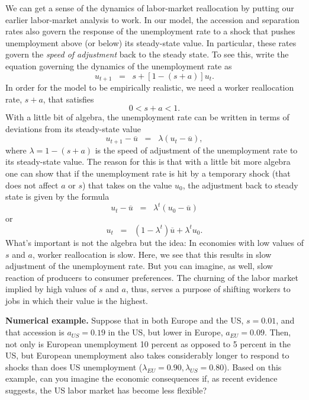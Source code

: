 We can get a sense of the dynamics of labor-market reallocation
 by putting our earlier labor-market analysis to work.
In our model, the accession and separation rates also govern the response of the unemployment rate to a shock that pushes unemployment above (or below) its steady-state value. In particular, these rates govern the {\it speed of adjustment} back to the steady state. To see this, write the equation governing the dynamics of the unemployment rate as
\[
    u_{t+1} \;\;=\;\; s+ [1-(s+a)] u_{t} .
\]
In order for the model to be empirically realistic, we need a worker reallocation rate, $s+a$, that satisfies
\[0<s+a<1.\]
With a little bit of algebra, the unemployment rate can be written in terms of deviations from its steady-state value
\[
    u_{t+1}-\overline{u} \;\;=\;\; \lambda (u_t-\overline{u}) ,
\]
where $\lambda=1-(s+a)$ is the speed of adjustment of the unemployment rate to its steady-state value. The reason for this is that with a little bit more algebra one can show that if the unemployment rate is hit by a temporary shock (that does not affect $a$ or $s$) that takes on the value $u_0$, the adjustment back to steady state is given by the formula
\[
    u_t-\overline{u} \;\;=\;\; \lambda^{t}(u_0-\overline{u})
\]
or
\[
    u_t \;\;=\;\; (1-\lambda^{t})\overline{u}+\lambda^{t}u_0 .
\]
What's important is not the algebra but the idea:
In economies with low values of $s$ and $a$,
worker reallocation is slow.
Here, we see that this results in slow adjustment of the unemployment rate.
But you can imagine, as well, slow reaction of producers to consumer
preferences.
The churning of the labor market implied by high values of $s$ and $a$,
thus, serves a purpose of shifting workers to jobs in which their value is the highest.



\begin{comment}
Notice that a high separation rate $s$ has two important effects on the economy: it (i)~raises the steady state unemployment rate, but (ii) helps the economy respond quickly to temporary shocks to unemployment. On the other hand, a high accession rate $a$ has two unambiguously good effects: it (i) reduces the steady state unemployment rate, and (ii) helps the economy respond quickly to temporary shocks. This suggests that one way to think about the European unemployment problem is as an economy with an $s$ that is moderate and an $a$ that is low.
\end{comment}

\textbf{Numerical example.} Suppose that in both Europe and the US, $s=0.01$, and that accession is $a_{US}=0.19$  in the US, but lower in Europe, $a_{EU}=0.09$. Then, not only is European unemployment 10 percent as opposed to 5 percent in the US, but European unemployment also takes considerably longer to respond to shocks than does US unemployment ($\lambda_{EU}=0.90,\lambda_{US}=0.80$). Based on this example, can you imagine the economic consequences if, as recent evidence suggests, the US labor market has become less flexible?



